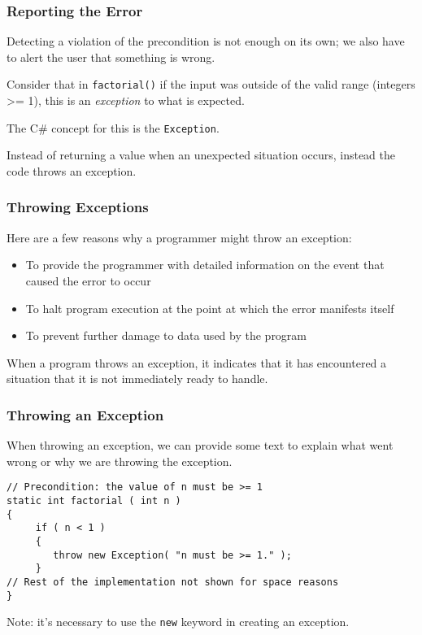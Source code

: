 \begin{frame}
\frametitle{Reporting the Error}
Detecting a violation of the precondition is not enough on its own; we also have to alert the user that something is wrong.

Consider that in \texttt{factorial()} if the input was outside of the valid range (integers >= 1), this is an \textit{exception} to what is expected.

The C\# concept for this is the \texttt{Exception}.

Instead of returning a value when an unexpected situation occurs, instead the code \alert{throw}s an exception.

\end{frame}

\begin{frame}
\frametitle{Throwing Exceptions}

Here are a few reasons why a programmer might throw an exception:

\begin{itemize}
	\item To provide the programmer with detailed information on the event that caused the error to occur
	\item To halt program execution at the point at which the error manifests itself
	\item To prevent further damage to data used by the program
\end{itemize}

When a program throws an exception, it indicates that it has encountered a situation that it is not immediately ready to handle.

\end{frame}

\begin{frame}[fragile]
\frametitle{Throwing an Exception}

When throwing an exception, we can provide some text to explain what went wrong or why we are throwing the exception.

\begin{verbatim}
// Precondition: the value of n must be >= 1
static int factorial ( int n )
{
     if ( n < 1 )
     {
        throw new Exception( "n must be >= 1." );
     }
// Rest of the implementation not shown for space reasons
}
\end{verbatim}

Note: it's necessary to use the \texttt{new} keyword in creating an exception.

\end{frame}

